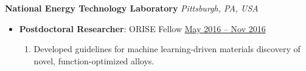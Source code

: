 {\color{red}\textbf{National Energy Technology Laboratory} \hfill \textit{Pittsburgh, PA, USA}}\par
\begin{itemize}
    \item
        \textbf{Postdoctoral Researcher}: ORISE Fellow
        \hfill \underline{May 2016 -- Nov 2016} \par
        \begin{enumerate}
            \item Developed guidelines for machine learning-driven materials discovery of novel, function-optimized alloys.
        \end{enumerate}
\end{itemize}